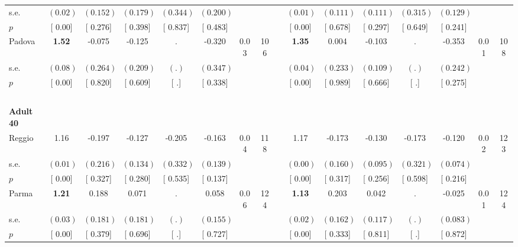 \begin{longtable}{L{8em} c c c c c c c p{1em} c c c c c c c}
\quad \quad \quad \quad s.e.& $ (     0.02)$ & $ (    0.152)$ & $ (    0.179)$ & $ (    0.344)$ & $ (    0.200)$ & & & & $ (     0.01)$ & $ (    0.111)$ & $ (    0.111)$ & $ (    0.315)$ & $ (    0.129)$ & &  \\*
\quad \quad \quad \quad $ p$ & [     0.00] & [    0.276] & [    0.398] & [    0.837] & [    0.483] & & & & [     0.00] & [    0.678] & [    0.297] & [    0.649] & [    0.241] & &  \\[1em]
\quad \quad \quad Padova& \textbf{     1.52} &    -0.075 &    -0.125 &         . &    -0.320 &      0.03 &       106 & & \textbf{     1.35} &     0.004 &    -0.103 &         . &    -0.353 &      0.01 &       108  \\*
\quad \quad \quad \quad s.e.& $ (     0.08)$ & $ (    0.264)$ & $ (    0.209)$ & $ (        .)$ & $ (    0.347)$ & & & & $ (     0.04)$ & $ (    0.233)$ & $ (    0.109)$ & $ (        .)$ & $ (    0.242)$ & &  \\*
\quad \quad \quad \quad $ p$ & [     0.00] & [    0.820] & [    0.609] & [        .] & [    0.338] & & & & [     0.00] & [    0.989] & [    0.666] & [        .] & [    0.275] & &  \\[1em]
~\\[1em]
\quad \quad \textbf{Adult 40} & & & & & & & & & & & & & & & \\* 
\quad \quad \quad Reggio& 1.16 &    -0.197 &    -0.127 &    -0.205 &    -0.163 &      0.04 &       118 & & 1.17 &    -0.173 &    -0.130 &    -0.173 &    -0.120 &      0.02 &       123  \\*
\quad \quad \quad \quad s.e.& $ (     0.01)$ & $ (    0.216)$ & $ (    0.134)$ & $ (    0.332)$ & $ (    0.139)$ & & & & $ (     0.00)$ & $ (    0.160)$ & $ (    0.095)$ & $ (    0.321)$ & $ (    0.074)$ & &  \\*
\quad \quad \quad \quad $ p$ & [     0.00] & [    0.327] & [    0.280] & [    0.535] & [    0.137] & & & & [     0.00] & [    0.317] & [    0.256] & [    0.598] & [    0.216] & &  \\[1em]
\quad \quad \quad Parma& \textbf{     1.21} &     0.188 &     0.071 &         . &     0.058 &      0.06 &       124 & & \textbf{     1.13} &     0.203 &     0.042 &         . &    -0.025 &      0.01 &       124  \\*
\quad \quad \quad \quad s.e.& $ (     0.03)$ & $ (    0.181)$ & $ (    0.181)$ & $ (        .)$ & $ (    0.155)$ & & & & $ (     0.02)$ & $ (    0.162)$ & $ (    0.117)$ & $ (        .)$ & $ (    0.083)$ & &  \\*
\quad \quad \quad \quad $ p$ & [     0.00] & [    0.379] & [    0.696] & [        .] & [    0.727] & & & & [     0.00] & [    0.333] & [    0.811] & [        .] & [    0.872] & &  \\[1em]

\end{longtable}
